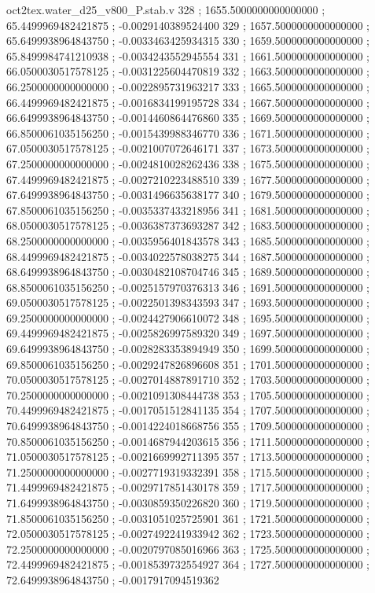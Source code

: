 \begin{filecontents}[overwrite]{oct2tex.water_d25_v800_P.stab.v}
328 ; 1655.5000000000000000 ; 65.4499969482421875 ; -0.0029140389524400
329 ; 1657.5000000000000000 ; 65.6499938964843750 ; -0.0033463425934315
330 ; 1659.5000000000000000 ; 65.8499984741210938 ; -0.0034243552945554
331 ; 1661.5000000000000000 ; 66.0500030517578125 ; -0.0031225604470819
332 ; 1663.5000000000000000 ; 66.2500000000000000 ; -0.0022895731963217
333 ; 1665.5000000000000000 ; 66.4499969482421875 ; -0.0016834199195728
334 ; 1667.5000000000000000 ; 66.6499938964843750 ; -0.0014460864476860
335 ; 1669.5000000000000000 ; 66.8500061035156250 ; -0.0015439988346770
336 ; 1671.5000000000000000 ; 67.0500030517578125 ; -0.0021007072646171
337 ; 1673.5000000000000000 ; 67.2500000000000000 ; -0.0024810028262436
338 ; 1675.5000000000000000 ; 67.4499969482421875 ; -0.0027210223488510
339 ; 1677.5000000000000000 ; 67.6499938964843750 ; -0.0031496635638177
340 ; 1679.5000000000000000 ; 67.8500061035156250 ; -0.0035337433218956
341 ; 1681.5000000000000000 ; 68.0500030517578125 ; -0.0036387373693287
342 ; 1683.5000000000000000 ; 68.2500000000000000 ; -0.0035956401843578
343 ; 1685.5000000000000000 ; 68.4499969482421875 ; -0.0034022578038275
344 ; 1687.5000000000000000 ; 68.6499938964843750 ; -0.0030482108704746
345 ; 1689.5000000000000000 ; 68.8500061035156250 ; -0.0025157970376313
346 ; 1691.5000000000000000 ; 69.0500030517578125 ; -0.0022501398343593
347 ; 1693.5000000000000000 ; 69.2500000000000000 ; -0.0024427906610072
348 ; 1695.5000000000000000 ; 69.4499969482421875 ; -0.0025826997589320
349 ; 1697.5000000000000000 ; 69.6499938964843750 ; -0.0028283353894949
350 ; 1699.5000000000000000 ; 69.8500061035156250 ; -0.0029247826896608
351 ; 1701.5000000000000000 ; 70.0500030517578125 ; -0.0027014887891710
352 ; 1703.5000000000000000 ; 70.2500000000000000 ; -0.0021091308444738
353 ; 1705.5000000000000000 ; 70.4499969482421875 ; -0.0017051512841135
354 ; 1707.5000000000000000 ; 70.6499938964843750 ; -0.0014224018668756
355 ; 1709.5000000000000000 ; 70.8500061035156250 ; -0.0014687944203615
356 ; 1711.5000000000000000 ; 71.0500030517578125 ; -0.0021669992711395
357 ; 1713.5000000000000000 ; 71.2500000000000000 ; -0.0027719319332391
358 ; 1715.5000000000000000 ; 71.4499969482421875 ; -0.0029717851430178
359 ; 1717.5000000000000000 ; 71.6499938964843750 ; -0.0030859350226820
360 ; 1719.5000000000000000 ; 71.8500061035156250 ; -0.0031051025725901
361 ; 1721.5000000000000000 ; 72.0500030517578125 ; -0.0027492241933942
362 ; 1723.5000000000000000 ; 72.2500000000000000 ; -0.0020797085016966
363 ; 1725.5000000000000000 ; 72.4499969482421875 ; -0.0018539732554927
364 ; 1727.5000000000000000 ; 72.6499938964843750 ; -0.0017917094519362

\end{filecontents}
